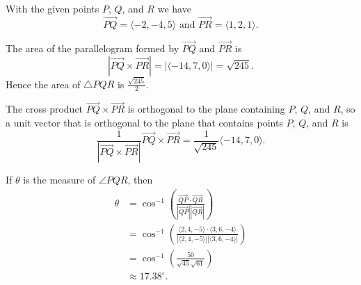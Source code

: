 \begin{exercises}
\begin{exerciseSolution}
\ba
		\item With the given points $P$, $Q$, and $R$ we have 
\[\overrightarrow{PQ} = \langle -2, -4, 5\rangle  \text{ and } \overrightarrow{PR} = \langle 1, 2, 1 \rangle.\]
		\item The area of the parallelogram formed by $\overrightarrow{PQ}$ and $\overrightarrow{PR}$ is
\[|\overrightarrow{PQ} \times \overrightarrow{PR}| = |\langle -14, 7, 0 \rangle | = \sqrt{245}.\]
Hence the area of $\triangle PQR$ is $\frac{\sqrt{245}}{2}$.
		\item The cross product $\overrightarrow{PQ} \times \overrightarrow{PR}$ is orthogonal to the plane containing $P$, $Q$, and $R$, so a  unit vector that is orthogonal to the plane that contains points $P$, $Q$, and $R$ is 
\[\frac{1}{|\overrightarrow{PQ} \times \overrightarrow{PR}|} \overrightarrow{PQ} \times \overrightarrow{PR} = \frac{1}{\sqrt{245}} \langle -14, 7, 0 \rangle.\]
		\item If $\theta$ is the measure of $\angle PQR$, then 
		\begin{align*}
\theta &= \cos^{-1}\left(\frac{\overrightarrow{QP} \cdot \overrightarrow{QR}}{|\overrightarrow{QP}| |\overrightarrow{QR}|} \right) \\
	&= \cos^{-1}\left(\frac{\langle 2, 4, -5 \rangle \cdot \langle 3, 6, -4 \rangle}{|\langle 2, 4, -5 \rangle| |\langle 3, 6, -4 \rangle|} \right)\\
	&= \cos^{-1}\left(\frac{50}{\sqrt{45} \sqrt{61}} \right) \\
	&\approx 17.38^{\circ}.
\end{align*} 
	\ea
\end{exerciseSolution}






\end{exercises}
\afterexercises
